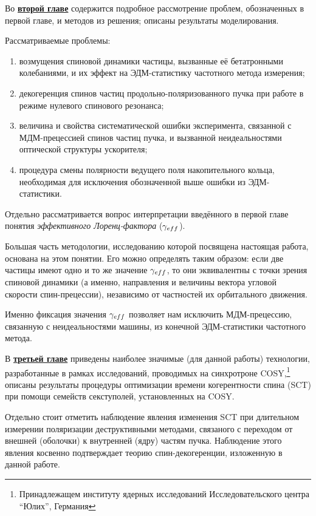 Во \underline{\textbf{второй главе}} содержится подробное рассмотрение проблем, обозначенных в первой главе, и методов из решения; описаны результаты моделирования. 

Рассматриваемые проблемы:
\begin{enumerate}
	\item возмущения спиновой динамики частицы, вызванные её бетатронными колебаниями, и их эффект на ЭДМ-статистику частотного метода измерения;
	\item декогеренция спинов частиц продольно-поляризованного пучка при работе в режиме нулевого спинового резонанса;
	\item величина и свойства систематической ошибки эксперимента, связанной с МДМ-прецессией спинов частиц пучка, и вызванной неидеальностями оптической структуры ускорителя;
	\item процедура смены полярности ведущего поля накопительного кольца, необходимая для исключения обозначенной выше ошибки из ЭДМ-статистики.
\end{enumerate}

Отдельно рассматривается вопрос интерпретации введённого в первой главе понятия \emph{эффективного Лоренц-фактора} ($\gamma_{eff}$). 

Большая часть методологии, исследованию которой посвящена настоящая работа, основана на этом понятии. Его можно определять таким образом: если две частицы имеют одно и то же значение $\gamma_{eff}$, то они эквивалентны с точки зрения спиновой динамики (а именно, направления и величины вектора угловой скорости спин-прецессии), независимо от частностей их орбитального движения. 

Именно фиксация значения $\gamma_{eff}$ позволяет нам исключить МДМ-прецессию, связанную с неидеальностями машины, из конечной ЭДМ-статистики частотного метода.

В \underline{\textbf{третьей главе}} приведены наиболее значимые (для данной работы) технологии, разработанные в рамках исследований, проводимых на синхротроне COSY,\footnote{Принадлежащем институту ядерных исследований Исследовательского центра ``Юлих'', Германия} описаны результаты процедуры оптимизации времени когерентности спина (SCT) при помощи семейств секступолей, установленных на COSY. 

Отдельно стоит отметить наблюдение явления изменения SCT при длительном измерении поляризации деструктивными методами, связаного с переходом от внешней (оболочки) к внутренней (ядру) частям пучка. Наблюдение этого явления косвенно подтверждает теорию спин-декогеренции, изложенную в данной работе.

